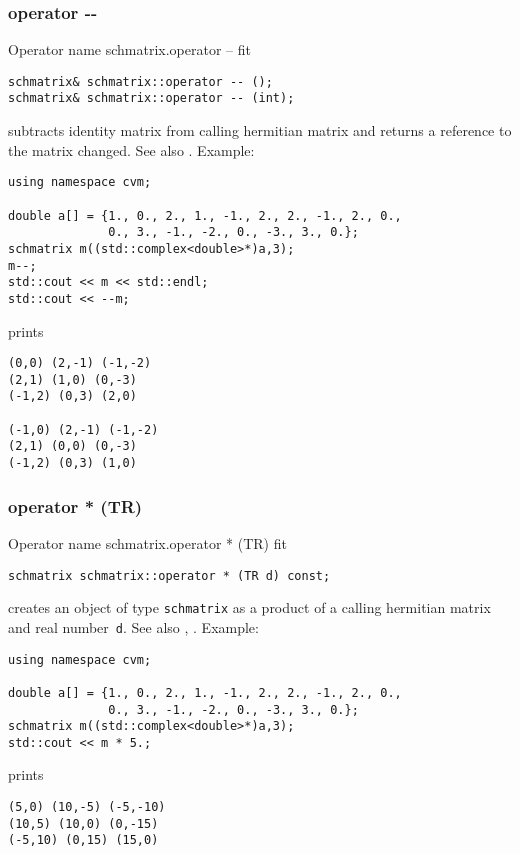 \subsubsection{operator -{}-}
Operator%
\pdfdest name {schmatrix.operator --} fit
\begin{verbatim}
schmatrix& schmatrix::operator -- ();
schmatrix& schmatrix::operator -- (int);
\end{verbatim}
subtracts identity matrix from  calling hermitian matrix
and returns a reference to
the matrix changed.
See also .
Example:
\begin{Verbatim}
using namespace cvm;

double a[] = {1., 0., 2., 1., -1., 2., 2., -1., 2., 0.,
              0., 3., -1., -2., 0., -3., 3., 0.};
schmatrix m((std::complex<double>*)a,3);
m--;
std::cout << m << std::endl;
std::cout << --m;
\end{Verbatim}
prints
\begin{Verbatim}
(0,0) (2,-1) (-1,-2)
(2,1) (1,0) (0,-3)
(-1,2) (0,3) (2,0)

(-1,0) (2,-1) (-1,-2)
(2,1) (0,0) (0,-3)
(-1,2) (0,3) (1,0)
\end{Verbatim}
\newpage




\subsubsection{operator * (TR)}
Operator%
\pdfdest name {schmatrix.operator * (TR)} fit
\begin{verbatim}
schmatrix schmatrix::operator * (TR d) const;
\end{verbatim}
creates an object of type \verb"schmatrix" as a product of
a calling hermitian matrix and  real number~\verb"d".
See also ,
.
Example:
\begin{Verbatim}
using namespace cvm;

double a[] = {1., 0., 2., 1., -1., 2., 2., -1., 2., 0.,
              0., 3., -1., -2., 0., -3., 3., 0.};
schmatrix m((std::complex<double>*)a,3);
std::cout << m * 5.;
\end{Verbatim}
prints
\begin{Verbatim}
(5,0) (10,-5) (-5,-10)
(10,5) (10,0) (0,-15)
(-5,10) (0,15) (15,0)
\end{Verbatim}
\newpage



